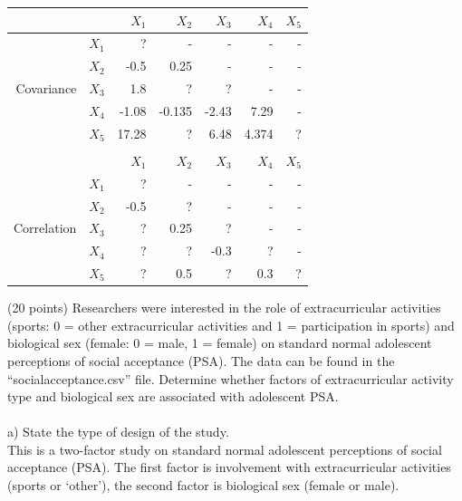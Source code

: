 \documentclass[onecolumn,10pt]{jhwhw}
\begin{document}
\begin{table}[h!]
\begin{center}
\begin{tabular}{rr|rrrrr}
\toprule
  & & $X_1$ & $X_2$ & $X_3$ & $X_4$ & $X_5$ \\
\midrule
            & $X_1$ & ?      & -       & -     & -     & -   \\
            & $X_2$ & -0.5   & 0.25    & -     & -     & -   \\
Covariance  & $X_3$ & 1.8    & ?       & ?     & -     & -   \\
            & $X_4$ & -1.08  & -0.135  & -2.43 & 7.29  & -   \\
            & $X_5$ & 17.28  & ?       &  6.48 & 4.374 & ?   \\
\bottomrule
\\
\toprule
  & & $X_1$ & $X_2$ & $X_3$ & $X_4$ & $X_5$ \\
\midrule
            & $X_1$ & ?      & -       & -     & -     & -   \\
            & $X_2$ & -0.5   & ?       & -     & -     & -   \\
Correlation & $X_3$ & ?      & 0.25    & ?     & -     & -   \\
            & $X_4$ & ?      & ?       & -0.3  & ?     & -   \\
            & $X_5$ & ?      & 0.5     & ?     & 0.3   & ?   \\
\bottomrule
\end{tabular}
\end{center}
\end{table}

\clearpage
\problem{}
(20 points) Researchers were interested in the role of extracurricular activities (sports: 0 = other extracurricular activities and 1 = participation in sports) and biological sex (female: 0 = male, 1 = female) on standard normal adolescent perceptions of social acceptance (PSA). The data can be found in the “socialacceptance.csv” file. Determine whether factors of extracurricular activity type and biological sex are associated with adolescent PSA.\\
\\
a) State the type of design of the study.\\

This is a two-factor study on standard normal adolescent perceptions of social acceptance (PSA). The first factor is involvement with extracurricular activities (sports or `other'), the second factor is biological sex (female or male).
\\
\end{document}
